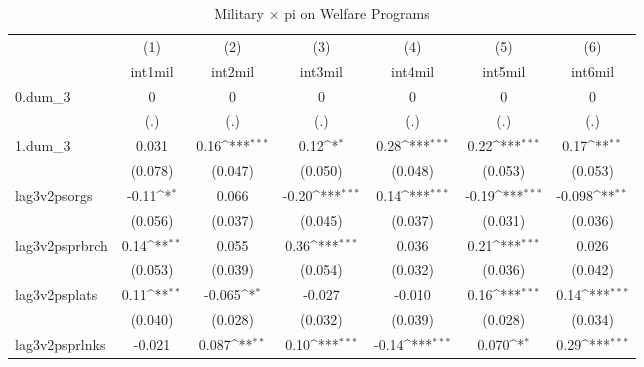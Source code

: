 \begin{table}[htbp]\centering
\def\sym#1{\ifmmode^{#1}\else\(^{#1}\)\fi}
\caption{Military $\times$ pi on Welfare Programs}
\begin{tabular}{l*{6}{c}}
\hline\hline
            &\multicolumn{1}{c}{(1)}         &\multicolumn{1}{c}{(2)}         &\multicolumn{1}{c}{(3)}         &\multicolumn{1}{c}{(4)}         &\multicolumn{1}{c}{(5)}         &\multicolumn{1}{c}{(6)}         \\
            &     int1mil         &     int2mil         &     int3mil         &     int4mil         &     int5mil         &     int6mil         \\
\hline
0.dum\_3     &           0         &           0         &           0         &           0         &           0         &           0         \\
            &         (.)         &         (.)         &         (.)         &         (.)         &         (.)         &         (.)         \\
[1em]
1.dum\_3     &       0.031         &        0.16\sym{***}&        0.12\sym{*}  &        0.28\sym{***}&        0.22\sym{***}&        0.17\sym{**} \\
            &     (0.078)         &     (0.047)         &     (0.050)         &     (0.048)         &     (0.053)         &     (0.053)         \\
[1em]
lag3v2psorgs&       -0.11\sym{*}  &       0.066         &       -0.20\sym{***}&        0.14\sym{***}&       -0.19\sym{***}&      -0.098\sym{**} \\
            &     (0.056)         &     (0.037)         &     (0.045)         &     (0.037)         &     (0.031)         &     (0.036)         \\
[1em]
lag3v2psprbrch&        0.14\sym{**} &       0.055         &        0.36\sym{***}&       0.036         &        0.21\sym{***}&       0.026         \\
            &     (0.053)         &     (0.039)         &     (0.054)         &     (0.032)         &     (0.036)         &     (0.042)         \\
[1em]
lag3v2psplats&        0.11\sym{**} &      -0.065\sym{*}  &      -0.027         &      -0.010         &        0.16\sym{***}&        0.14\sym{***}\\
            &     (0.040)         &     (0.028)         &     (0.032)         &     (0.039)         &     (0.028)         &     (0.034)         \\
[1em]
lag3v2psprlnks&      -0.021         &       0.087\sym{**} &        0.10\sym{***}&       -0.14\sym{***}&       0.070\sym{*}  &        0.29\sym{***}\\

\end{tabular}
\end{table}
